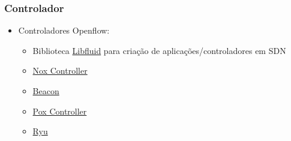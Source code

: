 %
%
\begin{frame}\frametitle{Controlador}

    \begin{itemize}
    \item Controladores Openflow:
          \begin{itemize}
          \item Biblioteca \href{http://opennetworkingfoundation.github.io/libfluid/index.html}{Libfluid}
                para criação de aplicações/controladores em SDN
          \item \href{http://www.noxrepo.org/nox/about-nox/}{Nox Controller}
          \item \href{https://openflow.stanford.edu/display/Beacon/Home}{Beacon}
          \item \href{http://www.noxrepo.org/pox/about-pox/}{Pox Controller}
          \item \href{http://osrg.github.io/ryu/}{Ryu}
          \end{itemize}
    \end{itemize}
\end{frame}
